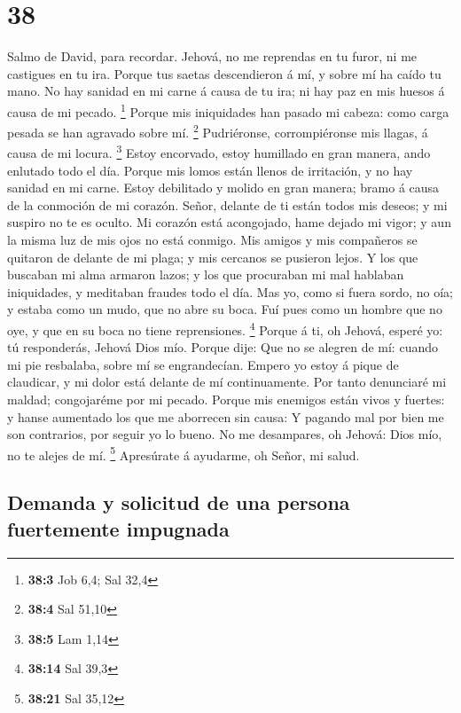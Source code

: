 \hypertarget{section-37}{%
\section{38}\label{section-37}}

 Salmo de David, para recordar. Jehová, no me reprendas en
tu furor, ni me castigues en tu ira.  Porque tus saetas
descendieron á mí, y sobre mí ha caído tu mano.  No hay
sanidad en mi carne á causa de tu ira; ni hay paz en mis huesos á causa
de mi pecado. \footnote{\textbf{38:3} Job 6,4; Sal 32,4} 
Porque mis iniquidades han pasado mi cabeza: como carga pesada se han
agravado sobre mí. \footnote{\textbf{38:4} Sal 51,10} 
Pudriéronse, corrompiéronse mis llagas, á causa de mi locura.
\footnote{\textbf{38:5} Lam 1,14}  Estoy encorvado, estoy
humillado en gran manera, ando enlutado todo el día.  Porque
mis lomos están llenos de irritación, y no hay sanidad en mi carne.
 Estoy debilitado y molido en gran manera; bramo á causa de
la conmoción de mi corazón.  Señor, delante de ti están
todos mis deseos; y mi suspiro no te es oculto.  Mi corazón
está acongojado, hame dejado mi vigor; y aun la misma luz de mis ojos no
está conmigo.  Mis amigos y mis compañeros se quitaron de
delante de mi plaga; y mis cercanos se pusieron lejos.  Y
los que buscaban mi alma armaron lazos; y los que procuraban mi mal
hablaban iniquidades, y meditaban fraudes todo el día.  Mas
yo, como si fuera sordo, no oía; y estaba como un mudo, que no abre su
boca.  Fuí pues como un hombre que no oye, y que en su boca
no tiene reprensiones. \footnote{\textbf{38:14} Sal 39,3} 
Porque á ti, oh Jehová, esperé yo: tú responderás, Jehová Dios mío.
 Porque dije: Que no se alegren de mí: cuando mi pie
resbalaba, sobre mí se engrandecían.  Empero yo estoy á
pique de claudicar, y mi dolor está delante de mí continuamente.
 Por tanto denunciaré mi maldad; congojaréme por mi pecado.
 Porque mis enemigos están vivos y fuertes: y hanse
aumentado los que me aborrecen sin causa:  Y pagando mal
por bien me son contrarios, por seguir yo lo bueno.  No me
desampares, oh Jehová: Dios mío, no te alejes de mí. \footnote{\textbf{38:21}
  Sal 35,12}  Apresúrate á ayudarme, oh Señor, mi salud.

\hypertarget{demanda-y-solicitud-de-una-persona-fuertemente-impugnada}{%
\subsection{Demanda y solicitud de una persona fuertemente
impugnada}\label{demanda-y-solicitud-de-una-persona-fuertemente-impugnada}}

